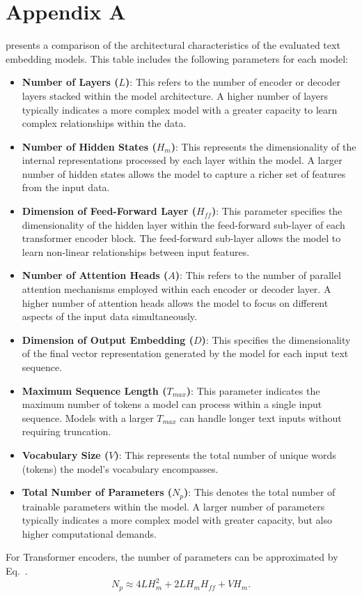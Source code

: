 
\chapter{Appendix A} \label{chap:appendix_A}

 presents a comparison of the architectural characteristics of the evaluated text embedding models.
This table includes the following parameters for each model:

\begin{itemize}
    \item \textbf{Number of Layers ($L$)}:
 This refers to the number of encoder or decoder layers stacked within the model architecture.
 A higher number of layers typically indicates a more complex model with a greater capacity to learn complex relationships within the data.
    \item \textbf{Number of Hidden States ($H_m$)}:
 This represents the dimensionality of the internal representations processed by each layer within the model.
 A larger number of hidden states allows the model to capture a richer set of features from the input data.
    \item \textbf{Dimension of Feed-Forward Layer ($H_{ff}$)}:
 This parameter specifies the dimensionality of the hidden layer within the feed-forward sub-layer of each transformer encoder block.
 The feed-forward sub-layer allows the model to learn non-linear relationships between input features.
    \item \textbf{Number of Attention Heads ($A$)}:
 This refers to the number of parallel attention mechanisms employed within each encoder or decoder layer.
 A higher number of attention heads allows the model to focus on different aspects of the input data simultaneously.
    \item \textbf{Dimension of Output Embedding ($D$)}:
 This specifies the dimensionality of the final vector representation generated by the model for each input text sequence.
    \item \textbf{Maximum Sequence Length ($T_{max}$)}:
 This parameter indicates the maximum number of tokens a model can process within a single input sequence.
 Models with a larger $T_{max}$ can handle longer text inputs without requiring truncation.
    \item \textbf{Vocabulary Size ($V$)}:
 This represents the total number of unique words (tokens) the model's vocabulary encompasses.
    \item \textbf{Total Number of Parameters ($N_p$)}:
 This denotes the total number of trainable parameters within the model.
 A larger number of parameters typically indicates a more complex model with greater capacity, but also higher computational demands.
\end{itemize}


For Transformer encoders, the number of parameters can be approximated by Eq.~.
\begin{equation}
    \label{eq:model_params}
 N_p \approx 4LH_m^2 + 2LH_m H_{ff} + VH_m.
\end{equation}


